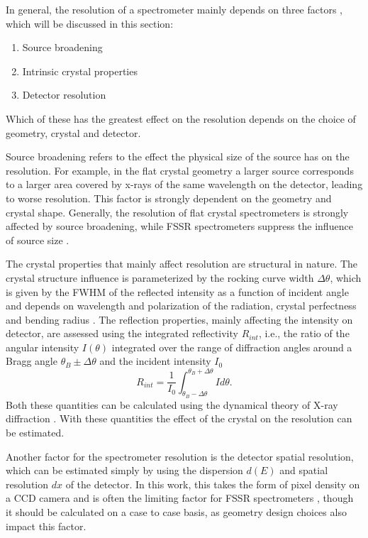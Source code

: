 In general, the resolution of a spectrometer mainly depends on three factors 
\citep{renner2019challenges,monot2002high}, which will be discussed in this 
section:
\begin{enumerate}
	\item Source broadening
	\item Intrinsic crystal properties
	\item Detector resolution
\end{enumerate}
Which of these has the greatest effect on the resolution depends on the choice 
of geometry, crystal and detector. 

Source broadening refers to the effect the physical size of the source has on 
the resolution. For example, in the flat crystal geometry a larger source 
corresponds to a larger area covered by x-rays of the same wavelength on the 
detector, 
leading to worse resolution. This factor is strongly dependent on the geometry 
and crystal shape. Generally, the resolution of flat crystal spectrometers is 
strongly affected by source broadening, while FSSR spectrometers suppress the 
influence of source size \citep{renner2019challenges}.

The crystal properties that mainly affect resolution are structural in nature. 
The crystal structure influence is parameterized by the 
rocking curve width $\Delta \theta$, which is given by the FWHM of the 
reflected intensity as a function of incident angle and depends on wavelength 
and polarization of the radiation, crystal perfectness and bending radius 
\citep{renner2019challenges, holzer1998flat}. The reflection properties, mainly 
affecting the intensity on detector, are 
assessed using the integrated reflectivity $R_{int}$, i.e., the ratio of the 
angular intensity 
$I(\theta)$ integrated over the range of diffraction angles around a Bragg 
angle $\theta_B \pm 
\Delta \theta$ and the incident intensity $I_0$ \citep{holzer1998flat}
\begin{equation}
	R_{int} = \frac{1}{I_0}\int_{\theta_B - \Delta \theta}^{\theta_B + \Delta 
	\theta} I d\theta.
\end{equation}
Both these quantities can be calculated using the dynamical theory of X-ray 
diffraction 
\citep{holzer1998flat}. With these 
quantities the effect of the crystal on the resolution can be 
estimated.

Another factor for the spectrometer resolution is the detector spatial 
resolution, which can be estimated simply by using the dispersion $d(E)$ and 
spatial resolution $dx$ of the detector. In this work, this takes the form of 
pixel density on a CCD camera and is often the limiting factor for FSSR spectrometers 
\citep{renner2019challenges, monot2002high}, though it should be calculated 
on a case to case basis, as geometry design choices also impact this factor. 

